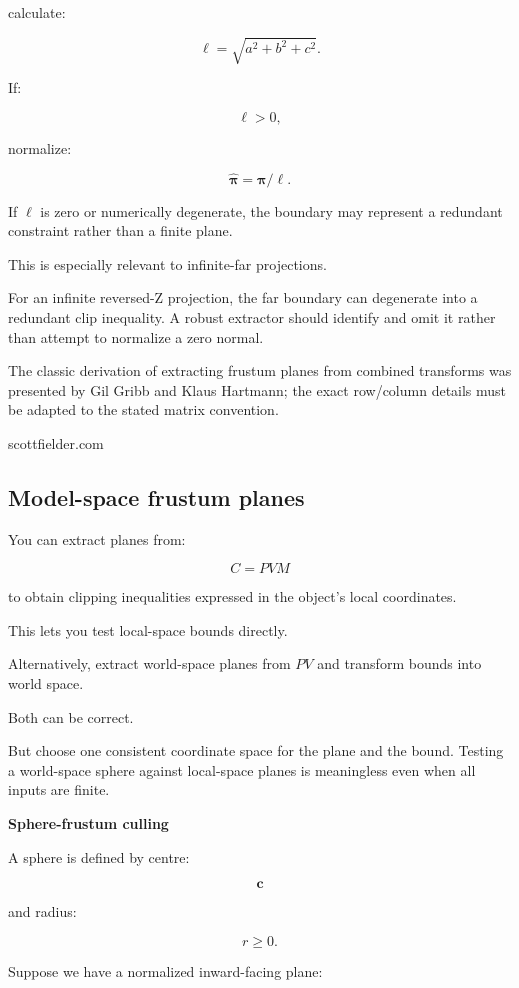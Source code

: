calculate:

\[
 \ell=\sqrt{a^2+b^2+c^2}.
\]

If:

\[
 \ell>0,
\]

normalize:

\[
 \boxed{ \hat{\boldsymbol\pi}=\boldsymbol\pi/\ell }.
\]

If \(\ell\) is zero or numerically degenerate, the boundary may represent a redundant constraint rather than a finite plane.

This is especially relevant to infinite-far projections.

For an infinite reversed-Z projection, the far boundary can degenerate into a redundant clip inequality. A robust extractor should identify and omit it rather than attempt to normalize a zero normal.

The classic derivation of extracting frustum planes from combined transforms was presented by Gil Gribb and Klaus Hartmann; the exact row/column details must be adapted to the stated matrix convention. 

scottfielder.com

\subsection{Model-space frustum planes}\label{02-foundations-ii-ch034-model-space-frustum-planes}

You can extract planes from:

\[
 C=PVM
\]

to obtain clipping inequalities expressed in the object's local coordinates.

This lets you test local-space bounds directly.

Alternatively, extract world-space planes from \(PV\) and transform bounds into world space.

Both can be correct.

But choose one consistent coordinate space for the plane and the bound. Testing a world-space sphere against local-space planes is meaningless even when all inputs are finite.

\textbf{Sphere-frustum culling}

A sphere is defined by centre:

\[
 \mathbf c
\]

and radius:

\[
 r\ge0.
\]

Suppose we have a normalized inward-facing plane:

